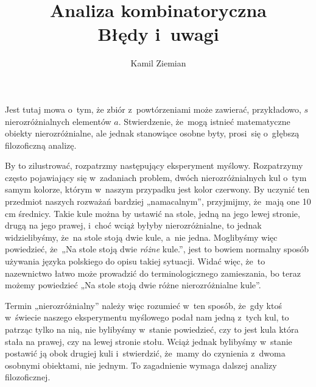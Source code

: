 \documentclass[a4paper,11pt]{article}
\title{Analiza kombinatoryczna \\
  Błędy i~uwagi}
\author{Kamil Ziemian}
\begin{document}





\maketitle %









\start {} Jest tutaj mowa o~tym, że zbiór z~powtórzeniami może
zawierać, przykładowo, $s$ nierozróżnialnych elementów $a$. Stwierdzenie,
że~mogą istnieć matematyczne obiekty nierozróżnialne, ale jednak stanowiące
osobne byty, prosi~się o~głębszą filozoficzną analizę.

By to zilustrować, rozpatrzmy następujący eksperyment myślowy. Rozpatrzymy
często pojawiający się w~zadaniach problem, dwóch nierozróżnialnych kul
o~tym samym kolorze, którym w~naszym przypadku jest kolor czerwony. By
uczynić ten przedmiot naszych rozważań bardziej „namacalnym”, przyjmijmy,
że~mają one 10 cm średnicy. Takie kule można by ustawić na stole, jedną na
jego lewej stronie, drugą na jego prawej, i~choć wciąż byłyby
nierozróżnialne, to jednak widzielibyśmy, że~na stole stoją dwie kule,
a~nie jedna. Moglibyśmy więc powiedzieć, że~„Na stole stoją dwie
\textit{różne} kule.”, jest to bowiem normalny sposób używania języka
polskiego do opisu takiej sytuacji. Widać więc, że~to nazewnictwo łatwo
może prowadzić do terminologicznego zamieszania, bo teraz możemy powiedzieć
„Na stole stoją dwie różne nierozróżnialne kule”.

Termin „nierozróżnialny” należy więc rozumieć w~ten sposób, że~gdy ktoś
w~świecie naszego eksperymentu myślowego podał nam jedną z~tych kul, to
patrząc tylko na nią, nie bylibyśmy w~stanie powiedzieć, czy to jest kula
która stała na prawej, czy na lewej stronie stołu. Wciąż jednak bylibyśmy
w~stanie postawić ją obok drugiej kuli i~stwierdzić, że~mamy do czynienia
z~dwoma osobnymi obiektami, nie jednym. To zagadnienie wymaga dalszej analizy
filozoficznej.
\end{document}
